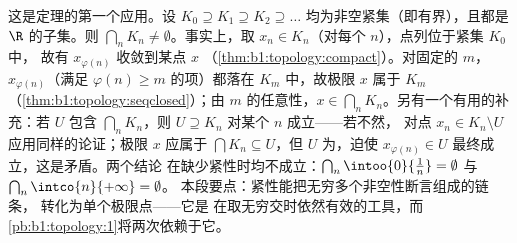 \begin{example}[嵌套紧集]\label{ex:b1:topology:nested}
这是定理的第一个应用。设 $K_0 \supseteq K_1 \supseteq
K_2 \supseteq \dots$ 均为非空紧集（即有界），且都是
$\R$ 的子集。则 $\bigcap_n K_n \neq \emptyset$。事实上，取 $x_n
\in K_n$（对每个 $n$），点列位于紧集 $K_0$ 中，
故有 $x_{\varphi(n)}$ 收敛到某点 $x$
（\cref{thm:b1:topology:compact}）。对固定的 $m$，
$x_{\varphi(n)}$（满足 $\varphi(n) \geq m$ 的项）都落在
$K_m$ 中，故极限 $x$ 属于 $K_m$
（\cref{thm:b1:topology:seqclosed}）；由 $m$ 的任意性，$x \in
\bigcap_n K_n$。另有一个有用的补充：若 $U$ 包含
$\bigcap_n K_n$，则 $U \supseteq K_n$ 对某个 $n$ 成立——若不然，
对点 $x_n \in K_n \setminus U$ 应用同样的论证；极限
$x$ 应属于 $\bigcap K_n \subseteq U$，但 $U$ 为，迫使
$x_{\varphi(n)} \in U$ 最终成立，这是矛盾。两个结论
在缺少紧性时均不成立：$\bigcap_n \intoo{0}{\frac
1n} = \emptyset$ 与 $\bigcap_n \intco{n}{+\infty} = \emptyset$。
本段要点：紧性能把无穷多个非空性断言组成的链条，
转化为单个极限点——它是
在取无穷交时依然有效的工具，而
\cref{pb:b1:topology:1}将两次依赖于它。
\end{example}

